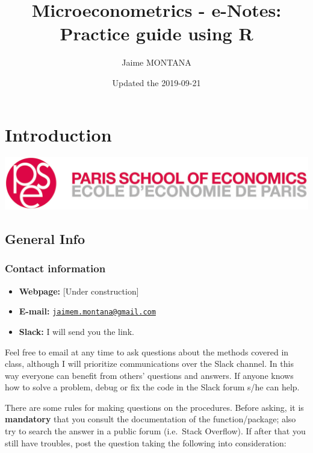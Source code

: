 \documentclass[]{book}
\title{Microeconometrics - e-Notes: Practice guide using R}
\author{Jaime MONTANA}
\date{Updated the 2019-09-21}
\providecommand{\tightlist}{%
  \setlength{\itemsep}{0pt}\setlength{\parskip}{0pt}}
\begin{document}
\maketitle

{
\setcounter{tocdepth}{1}
\tableofcontents
}
\chapter{Introduction}\label{introduction}

\begin{center}\includegraphics[width=0.9\linewidth]{./images/1200px-Logo_pse_petit} \end{center}

\section{General Info}\label{general-info}

\subsection{Contact information}\label{contact-information}

\begin{itemize}
\tightlist
\item
  \textbf{Webpage:} {[}Under construction{]}
\item
  \textbf{E-mail:}
  \href{mailto:jaimem.montana@gmail.com}{\nolinkurl{jaimem.montana@gmail.com}}
\item
  \textbf{Slack:} I will send you the link.
\end{itemize}

Feel free to email at any time to ask questions about the methods
covered in class, although I will prioritize communications over the
Slack channel. In this way everyone can benefit from others' questions
and answers. If anyone knows how to solve a problem, debug or fix the
code in the Slack forum s/he can help.

There are some rules for making questions on the procedures. Before
asking, it is \textbf{mandatory} that you consult the documentation of
the function/package; also try to search the answer in a public forum
(i.e.~Stack Overflow). If after that you still have troubles, post the
question taking the following into consideration:
\end{document}
